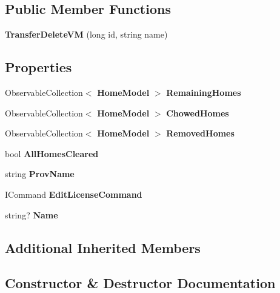 \subsection*{Public Member Functions}
\begin{DoxyCompactItemize}
\item 
\textbf{ Transfer\+Delete\+VM} (long id, string name)
\end{DoxyCompactItemize}
\subsection*{Properties}
\begin{DoxyCompactItemize}
\item 
Observable\+Collection$<$ \textbf{ Home\+Model} $>$ \textbf{ Remaining\+Homes}\hspace{0.3cm}{\ttfamily  [get, set]}
\item 
Observable\+Collection$<$ \textbf{ Home\+Model} $>$ \textbf{ Chowed\+Homes}\hspace{0.3cm}{\ttfamily  [get, set]}
\item 
Observable\+Collection$<$ \textbf{ Home\+Model} $>$ \textbf{ Removed\+Homes}\hspace{0.3cm}{\ttfamily  [get, set]}
\item 
bool \textbf{ All\+Homes\+Cleared}\hspace{0.3cm}{\ttfamily  [get, set]}
\item 
string \textbf{ Prov\+Name}\hspace{0.3cm}{\ttfamily  [get, set]}
\item 
I\+Command \textbf{ Edit\+License\+Command}\hspace{0.3cm}{\ttfamily  [get]}
\item 
string? \textbf{ Name}\hspace{0.3cm}{\ttfamily  [get]}
\end{DoxyCompactItemize}
\subsection*{Additional Inherited Members}


\subsection{Constructor \& Destructor Documentation}
\mbox{\label{class_a_f_h___scheduler_1_1_dialogs_1_1_confirmation_1_1_transfer_delete_v_m_a681b9fcafb134db17debab341e75687a}} 
